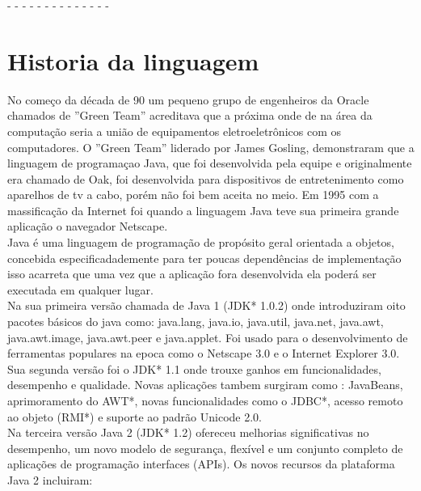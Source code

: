 \cite{Overbey:2009:RLR:1639949.1640127}-
\cite{Schaefer:2010:SIR:1932682.1869485}-
\cite{chomsky1956three}-
\cite{dyer2013large}-
\cite{Parnin:2011:JGA:1985441.1985446}-
\cite{Dyer:2014:MBA:2568225.2568295}-
\cite{Bracha:1998:MFS:286942.286957}-
\cite{Gamma:1995:DPE:186897}-
\cite{bracha1998gj}-
\cite{OracleGenerics}-
\cite{JDK11}-
\cite{JSE7ReleaseNotes}-
\cite{JSE7}-
\cite{JSE8Enhancements}-





\section{Historia da linguagem}

	No começo da década de 90 um pequeno grupo de engenheiros da Oracle chamados de ''Green Team'' acreditava que a próxima onde de na área da computação seria a união de equipamentos eletroeletrônicos com os computadores. O ''Green Team'' liderado por James Gosling, demonstraram que a linguagem de programaçao Java, que foi desenvolvida pela equipe e originalmente era chamado de Oak, foi desenvolvida para dispositivos de entretenimento como aparelhos de tv a cabo, porém não foi bem aceita no meio. Em 1995 com a massificação da Internet foi quando a linguagem Java teve sua primeira grande aplicação o navegador Netscape.\\
	
	Java é uma linguagem de programação de propósito geral orientada a objetos, concebida especificadademente para ter poucas dependências de implementação isso acarreta que uma vez que a aplicação fora desenvolvida ela poderá ser executada em qualquer lugar.\\
	
	Na sua primeira versão chamada de Java 1 (JDK* 1.0.2) onde introduziram oito pacotes básicos do java como: java.lang, java.io, java.util, java.net, java.awt, java.awt.image, java.awt.peer e java.applet. Foi usado para o desenvolvimento de ferramentas populares na epoca como o Netscape 3.0 e o Internet Explorer 3.0. \\
	
	Sua segunda versão foi o JDK* 1.1 onde trouxe ganhos em funcionalidades, desempenho e qualidade. Novas aplicações tambem surgiram como : JavaBeans, aprimoramento do AWT*, novas funcionalidades como o JDBC*, acesso remoto ao objeto (RMI*) e suporte ao padrão Unicode 2.0.\\
	
	Na terceira versão Java 2 (JDK* 1.2) ofereceu melhorias significativas no desempenho, um novo modelo de segurança, flexível e um conjunto completo de aplicações de programação interfaces (APIs). Os novos recursos da plataforma Java 2 incluiram: 
	
